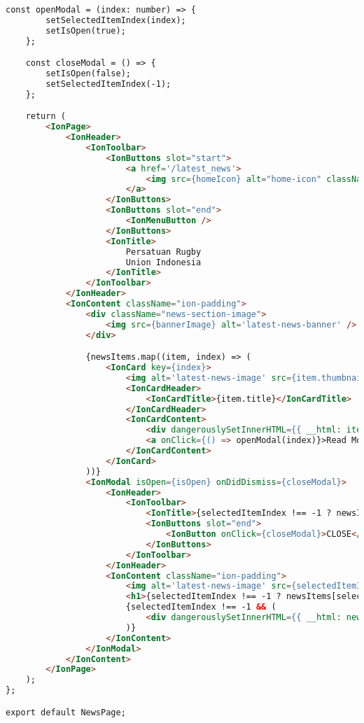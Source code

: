 \begin{lstlisting}[language=HTML, caption=latest\_news.tsx]
    const openModal = (index: number) => {
        setSelectedItemIndex(index);
        setIsOpen(true);
    };

    const closeModal = () => {
        setIsOpen(false);
        setSelectedItemIndex(-1);
    };

    return (
        <IonPage>
            <IonHeader>
                <IonToolbar>
                    <IonButtons slot="start">
                        <a href='/latest_news'>
                            <img src={homeIcon} alt="home-icon" className='home-icon' />
                        </a>
                    </IonButtons>
                    <IonButtons slot="end">
                        <IonMenuButton />
                    </IonButtons>
                    <IonTitle>
                        Persatuan Rugby
                        Union Indonesia
                    </IonTitle>
                </IonToolbar>
            </IonHeader>
            <IonContent className="ion-padding">
                <div className="news-section-image">
                    <img src={bannerImage} alt='latest-news-banner' />
                </div>

                {newsItems.map((item, index) => (
                    <IonCard key={index}>
                        <img alt='latest-news-image' src={item.thumbnail} />
                        <IonCardHeader>
                            <IonCardTitle>{item.title}</IonCardTitle>
                        </IonCardHeader>
                        <IonCardContent>
                            <div dangerouslySetInnerHTML={{ __html: item.description }}></div>
                            <a onClick={() => openModal(index)}>Read More...</a>
                        </IonCardContent>
                    </IonCard>
                ))}
                <IonModal isOpen={isOpen} onDidDismiss={closeModal}>
                    <IonHeader>
                        <IonToolbar>
                            <IonTitle>{selectedItemIndex !== -1 ? newsItems[selectedItemIndex].title : ''}</IonTitle>
                            <IonButtons slot="end">
                                <IonButton onClick={closeModal}>CLOSE</IonButton>
                            </IonButtons>
                        </IonToolbar>
                    </IonHeader>
                    <IonContent className="ion-padding">
                        <img alt='latest-news-image' src={selectedItemIndex !== -1 ? newsItems[selectedItemIndex].thumbnail : ''} />
                        <h1>{selectedItemIndex !== -1 ? newsItems[selectedItemIndex].title : ''}</h1>
                        {selectedItemIndex !== -1 && (
                            <div dangerouslySetInnerHTML={{ __html: newsItems[selectedItemIndex].content }}></div>
                        )}
                    </IonContent>
                </IonModal>
            </IonContent>
        </IonPage>
    );
};

export default NewsPage;
\end{lstlisting}

